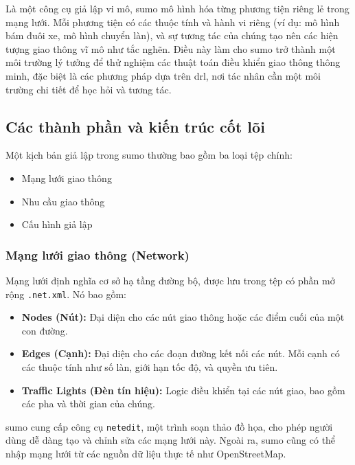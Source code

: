 Là một công cụ giả lập vi mô, \ac{sumo} mô hình hóa từng phương tiện riêng lẻ trong
mạng lưới. Mỗi phương tiện có các thuộc tính và hành vi riêng (ví dụ: mô hình
bám đuôi xe, mô hình chuyển làn), và sự tương tác của chúng tạo nên các hiện tượng
giao thông vĩ mô như tắc nghẽn. Điều này làm cho \ac{sumo} trở thành một môi trường
lý tưởng để thử nghiệm các thuật toán điều khiển giao thông thông minh, đặc biệt
là các phương pháp dựa trên \ac{drl}, nơi tác nhân cần một môi trường chi tiết
để học hỏi và tương tác.

\subsection{Các thành phần và kiến trúc cốt lõi}
Một kịch bản giả lập trong \ac{sumo} thường bao gồm ba loại tệp chính:
\begin{itemize}
    \item Mạng lưới giao thông

    \item Nhu cầu giao thông

    \item Cấu hình giả lập
\end{itemize}

\subsubsection{Mạng lưới giao thông (Network)}
Mạng lưới định nghĩa cơ sở hạ tầng đường bộ, được lưu trong tệp có phần mở rộng
\texttt{.net.xml}. Nó bao gồm:
\begin{itemize}
    \item \textbf{Nodes (Nút):} Đại diện cho các nút giao thông hoặc các điểm
        cuối của một con đường.

    \item \textbf{Edges (Cạnh):} Đại diện cho các đoạn đường kết nối các nút. Mỗi
        cạnh có các thuộc tính như số làn, giới hạn tốc độ, và quyền ưu tiên.

    \item \textbf{Traffic Lights (Đèn tín hiệu):} Logic điều khiển tại các nút
        giao, bao gồm các pha và thời gian của chúng.
\end{itemize}
\ac{sumo} cung cấp công cụ \texttt{netedit}, một trình soạn thảo đồ họa, cho phép
người dùng dễ dàng tạo và chỉnh sửa các mạng lưới này. Ngoài ra, \ac{sumo} cũng
có thể nhập mạng lưới từ các nguồn dữ liệu thực tế như OpenStreetMap.

